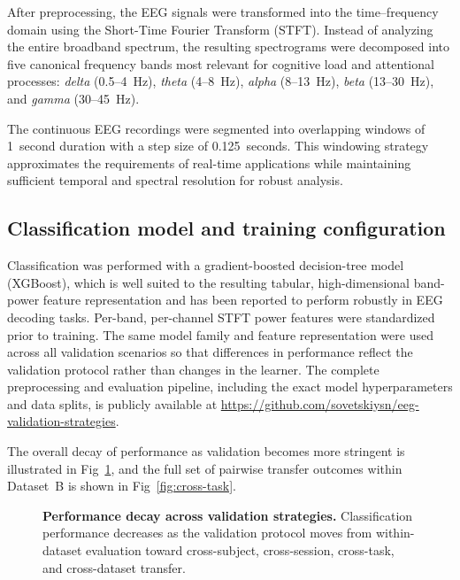 \documentclass[10pt,letterpaper]{article}
\newcommand{\rev}[1]{#1} %
\newcommand{\revs}[1]{#1} %
\providecommand{\DIFdelbegin}{} %
\providecommand{\DIFaddbeginFL}{} %
\providecommand{\DIFaddendFL}{} %
\providecommand{\DIFdelendFL}{} %
\providecommand{\DIFscaledelfig}{0.5}
\newlength{\DIFdelgraphicswidth} %
\newlength{\DIFdelgraphicsheight} %
\providecommand{\DIFaddincludegraphics}[2][]{{\color{blue}\fbox{\DIFOincludegraphics[#1]{#2}}}} %
\providecommand{\DIFdelincludegraphics}[2][]{%
\sbox{\DIFdelgraphicsbox}{\DIFOincludegraphics[#1]{#2}}%
\settoboxwidth{\DIFdelgraphicswidth}{\DIFdelgraphicsbox} %
\settoboxtotalheight{\DIFdelgraphicsheight}{\DIFdelgraphicsbox} %
\scalebox{\DIFscaledelfig}{%
\parbox[b]{\DIFdelgraphicswidth}{\usebox{\DIFdelgraphicsbox}\\[-\baselineskip] \rule{\DIFdelgraphicswidth}{0em}}\llap{\resizebox{\DIFdelgraphicswidth}{\DIFdelgraphicsheight}{%
\setlength{\unitlength}{\DIFdelgraphicswidth}%
\begin{picture}(1,1)%
\thicklines\linethickness{2pt} %
{\color[rgb]{1,0,0}\put(0,0){\framebox(1,1){}}}%
{\color[rgb]{1,0,0}\put(0,0){\line( 1,1){1}}}%
{\color[rgb]{1,0,0}\put(0,1){\line(1,-1){1}}}%
\end{picture}%
}\hspace*{3pt}}} %
} %
\DeclareRobustCommand{\DIFdelbegin}{\DIFOdelbegin \let\includegraphics\DIFdelincludegraphics} %
\DeclareRobustCommand{\DIFaddbeginFL}{\DIFOaddbeginFL \let\includegraphics\DIFaddincludegraphics} %
\DeclareRobustCommand{\DIFaddendFL}{\DIFOaddendFL \let\includegraphics\DIFOincludegraphics} %
\DeclareRobustCommand{\DIFdelendFL}{\DIFOaddendFL \let\includegraphics\DIFOincludegraphics} %
\begin{document}
After preprocessing, the EEG signals were transformed into the time--frequency domain using the Short-Time Fourier Transform (STFT). Instead of analyzing the entire broadband spectrum, the resulting spectrograms were decomposed into five canonical frequency bands most relevant for cognitive load and attentional processes: \textit{delta} (0.5--4~Hz), \textit{theta} (4--8~Hz), \textit{alpha} (8--13~Hz), \textit{beta} (13--30~Hz), and \textit{gamma} (30--45~Hz).

The continuous EEG recordings were segmented into overlapping windows of 1~second duration with a step size of 0.125~seconds. This windowing strategy approximates the requirements of real-time applications while maintaining sufficient temporal and spectral resolution for robust analysis.

\subsection*{\revs{Classification model and training configuration}}

\rev{Classification was performed with a gradient-boosted decision-tree model (XGBoost), which is well suited to the resulting tabular, high-dimensional band-power feature representation and has been reported to perform robustly in EEG decoding tasks. Per-band, per-channel STFT power features were standardized prior to training. The same model family and feature representation were used across all validation scenarios so that differences in performance reflect the validation protocol rather than changes in the learner. The complete preprocessing and evaluation pipeline, including the exact model hyperparameters and data splits, is publicly available at \url{https://github.com/sovetskiysn/eeg-validation-strategies}.}

The overall decay of performance as validation becomes more stringent is illustrated in Fig~\ref{fig:performance_decay}, and the full set of pairwise transfer outcomes within Dataset~B is shown in Fig~\ref{fig:cross-task}.

\DIFdelbegin %
\DIFdelendFL \DIFaddbeginFL \begin{figure}[!h]
\DIFaddendFL \caption{\textbf{Performance decay across validation strategies.}
Classification performance decreases as the validation protocol moves from within-dataset evaluation toward cross-subject, cross-session, cross-task, and cross-dataset transfer.}
\label{fig:performance_decay}
\end{figure}
\end{document}

